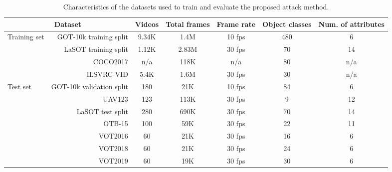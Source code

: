 \documentclass[12pt]{article}
\begin{document}
\begin{table}[h]
    \renewcommand\thetable{I}
    \centering
    \renewcommand\tabcolsep{2.5pt} %
    \footnotesize
    \caption{Characteristics of the datasets used to train and evaluate the proposed attack method.}
    \begin{tabular}{lrccccc} \toprule
    \multicolumn{2}{c}{Dataset}                            & Videos & Total frames & Frame rate & Object classes & Num. of attributes \\ \midrule
    \multirow{4}{*}{Training set} & GOT-10k training split & 9.34K  & 1.4M        & 10 fps     & 480            & 6                  \\
                                  & LaSOT training split   & 1.12K  & 2.83M        & 30 fps     & 70             & 14                 \\
                                  & COCO2017               & n/a    & 118K         & n/a        & 80             & n/a                \\
                                  & ILSVRC-VID             & 5.4K   & 1.6M         & 30 fps     & 30             & n/a                \\ \midrule
    \multirow{7}{*}{Test set}     & GOT-10k validation split&180    & 21K          & 10 fps     & 84             & 6                  \\
                                  & UAV123                 & 123    & 113K         & 30 fps     & 9              & 12                 \\
                                  & LaSOT test split       & 280    & 690K         & 30 fps     & 70             & 14                 \\
                                  & OTB-15                 & 100    & 59K          & 30 fps     & 22             & 11                 \\
                                  & VOT2016                & 60     & 21K          & 30 fps     & 16             & 6                  \\
                                  & VOT2018                & 60     & 21K          & 30 fps     & 24             & 6                  \\ 
                                  & VOT2019                & 60     & 19K          & 30 fps     & 30             & 6                  \\ \bottomrule
    \end{tabular}
    \label{tab:dataset}
\end{table}
\end{document}
